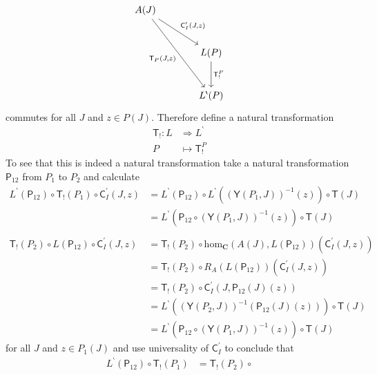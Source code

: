 \begin{prf}
\[\begin{tikzcd}[sep=large]
  A(J)
  \arrow{dr}{\mathsf{C}_{I}^{\prime}(J,z)}
  \arrow[swap]{ddr}{\mathsf{T}_{P}(J,z)}
  &
  \\
  &
  L(P)
  \arrow{d}{\mathsf{T}_{!}^{P}}
  \\
  &
  L^{\backprime}(P)
\end{tikzcd}
\]
commutes for all $J$ and $z \in P(J)$. Therefore define a natural transformation
\begin{align*}
  \mathsf{T}_{!}
  \colon
  L
  &\Rightarrow
  L^{\backprime}
  \\
  P
  &\mapsto
  \mathsf{T}_{!}^{P}
\end{align*}
To see that this is indeed a natural transformation take a natural transformation $\mathsf{P}_{12}$ from $P_{1}$ to $P_{2}$ and calculate
\begin{align*}
  L^{\backprime}(\mathsf{P}_{12})
  \circ
  \mathsf{T}_{!}(P_{1})
  \circ
  \mathsf{C}_{I}^{\prime}(J,z)
  &=
  L^{\backprime}(\mathsf{P}_{12})
  \circ
  L^{\backprime}
  \left(
    (\mathsf{Y}(P_{1},J))^{-1}(z)
  \right)
  \circ
  \mathsf{T}(J)
  \\
  &=
  L^{\backprime}
  \left(
    \mathsf{P}_{12}
    \circ
    (\mathsf{Y}(P_{1},J))^{-1}(z)
  \right)
  \circ
  \mathsf{T}(J)
  \\\\
  \mathsf{T}_{!}(P_{2})
  \circ
  L(\mathsf{P}_{12})
  \circ
  \mathsf{C}_{I}^{\prime}(J,z)
  &=
  \mathsf{T}_{!}(P_{2})
  \circ
  \mathrm{hom}_{\mathbf{C}}
  \left(
    A(J),
    L(\mathsf{P}_{12})
  \right)
  \left(
    \mathsf{C}_{I}^{\prime}(J,z)
  \right)
  \\
  &=
  \mathsf{T}_{!}(P_{2})
  \circ
  R_{A}
  \left(
    L(\mathsf{P}_{12})
  \right)
  \left(
    \mathsf{C}_{I}^{\prime}(J,z)
  \right)
  \\
  &=
  \mathsf{T}_{!}(P_{2})
  \circ
  \mathsf{C}_{I}^{\prime}
  \left(
    J,
    \mathsf{P}_{12}(J)(z)
  \right)
  \\
  &=
  L^{\backprime}
  \left(
    (\mathsf{Y}(P_{2},J))^{-1}(\mathsf{P}_{12}(J)(z))
  \right)
  \circ
  \mathsf{T}(J)
  \\
  &=
  L^{\backprime}
  \left(
    \mathsf{P}_{12}
    \circ
    (\mathsf{Y}(P_{1},J))^{-1}(z)
  \right)
  \circ
  \mathsf{T}(J)
  \tag{NT}
\end{align*}
for all $J$ and $z \in P_{1}(J)$ and use universality of $\mathsf{C}_{I}^{\prime}$ to conclude that
\begin{align*}
  L^{\backprime}(\mathsf{P}_{12})
  \circ
  \mathsf{T}_{!}(P_{1})
  &=
  \mathsf{T}_{!}(P_{2})
  \circ

\end{align*}
\end{prf}
